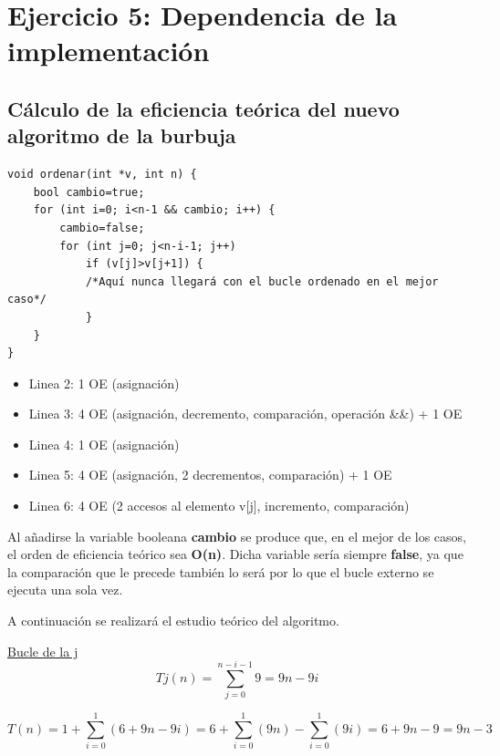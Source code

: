 \newpage


\section{Ejercicio 5: Dependencia de la implementación}
\subsection{Cálculo de la eficiencia teórica del nuevo algoritmo de la burbuja}
\begin {lstlisting}
void ordenar(int *v, int n) {
    bool cambio=true;
    for (int i=0; i<n-1 && cambio; i++) {
        cambio=false;
        for (int j=0; j<n-i-1; j++)
            if (v[j]>v[j+1]) {
            /*Aquí nunca llegará con el bucle ordenado en el mejor caso*/
            }
    }
}
\end{lstlisting}

\begin{itemize}
	\item Linea 2: 1 OE (asignación)
	\item Linea 3: 4 OE (asignación, decremento, comparación, operación \&\&) + 1 OE	
	\item Linea 4: 1 OE (asignación)
	\item Linea 5: 4 OE (asignación, 2 decrementos, comparación) + 1 OE
	\item Linea 6: 4 OE (2 accesos al elemento v[j], incremento, comparación)
\end{itemize}
Al añadirse la variable booleana \textbf{cambio} se produce que, en el mejor de los casos, el orden de eficiencia teórico sea \textbf{O(n)}. Dicha variable sería siempre \textbf{false}, ya que la comparación que le precede también lo será por lo que el bucle externo se ejecuta una sola vez.

A continuación se realizará el estudio teórico del algoritmo.


\underline{Bucle de la j}
\begin{equation}
Tj(n)= \sum_{j=0}^{n-i-1}9 = 9n - 9i
\end{equation}

\begin{equation}
T(n)=1 + \sum_{i=0}^{1}(6 + 9n -9i) = 6 + \sum_{i=0}^{1}(9n) - \sum_{i=0}^{1}(9i) = 6+9n - 9 = 9n - 3
\end{equation}

